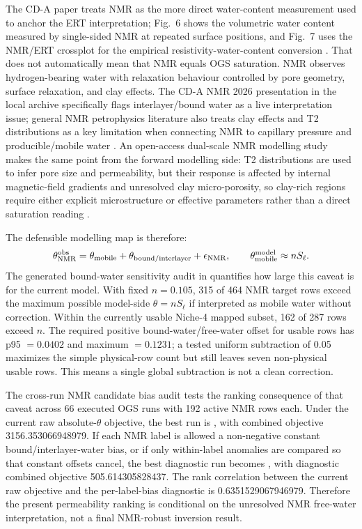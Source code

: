 The CD-A paper treats NMR as the more direct water-content measurement used to anchor
the ERT interpretation; Fig.~6 shows the volumetric water content measured by
single-sided NMR at repeated surface positions, and Fig.~7 uses the NMR/ERT crossplot
for the empirical resistivity-water-content conversion
\cite[pp.~4451--4453]{WaterContentEDZ2024}.  That does not automatically mean that
NMR equals OGS saturation.  NMR observes hydrogen-bearing water with relaxation
behaviour controlled by pore geometry, surface relaxation, and clay effects.  The CD-A
NMR 2026 presentation in the local archive specifically flags interlayer/bound water
as a live interpretation issue; general NMR petrophysics literature also treats clay
effects and T2 distributions as a key limitation when connecting NMR to capillary
pressure and producible/mobile water
\cite[PDF pp.~23--24]{NMR2026Local}\cite[pp.~761--763]{Kleinberg1996NMR}.
An open-access dual-scale NMR modelling study makes the same point from the forward
modelling side: T2 distributions are used to infer pore size and permeability, but
their response is affected by internal magnetic-field gradients and unresolved clay
micro-porosity, so clay-rich regions require either explicit microstructure or
effective parameters rather than a direct saturation reading
\cite[pp.~453--455]{Cui2022DualScaleNMR}.

The defensible modelling map is therefore:
\[
\theta_{\rm NMR}^{\rm obs}
=\theta_{\rm mobile}+\theta_{\rm bound/interlayer}+\epsilon_{\rm NMR},
\qquad
\theta_{\rm mobile}^{\rm model}\approx nS_\ell .
\]
The generated bound-water sensitivity audit in
quantifies how large this caveat is for the current model.  With fixed
\(n=0.105\), 315 of 464 NMR target rows exceed the maximum possible
model-side \(\theta=nS_\ell\) if interpreted as mobile water without correction.
Within the currently usable Niche-4 mapped subset, 162 of 287 rows exceed \(n\).
The required positive bound-water/free-water offset for usable rows has
p95 \(=0.0402\) and maximum \(=0.1231\); a tested uniform subtraction of 0.05
maximizes the simple physical-row count but still leaves seven non-physical usable
rows.  This means a single global subtraction is not a clean correction.

The cross-run NMR candidate bias audit
 tests the ranking consequence of
that caveat across 66 executed OGS runs with 192 active NMR rows each.  Under the
current raw absolute-\(\theta\) objective, the best run is
, with combined
objective 3156.353066948979.  If each NMR label is allowed a non-negative constant
bound/interlayer-water bias, or if only within-label anomalies are compared so that
constant offsets cancel, the best diagnostic run becomes
, with diagnostic combined objective
505.614305828437.  The rank correlation between the current raw objective and the
per-label-bias diagnostic is 0.6351529067946979.  Therefore the present permeability
ranking is conditional on the unresolved NMR free-water interpretation, not a final
NMR-robust inversion result.

